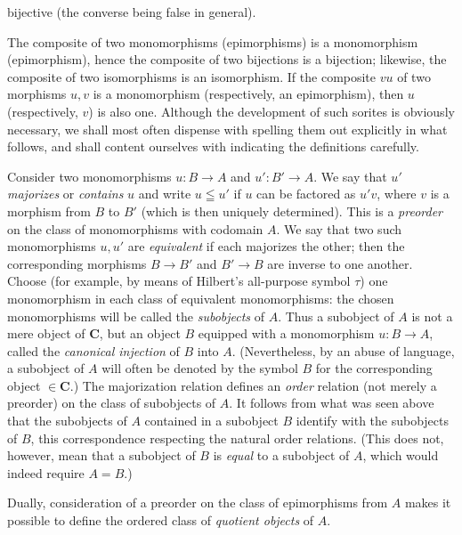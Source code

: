 
\noindent bijective (the converse being false in general).

The composite of two monomorphisms (epimorphisms) is a monomorphism
(epimorphism), hence the composite of two bijections is a bijection; likewise,
the composite of two isomorphisms is an isomorphism. If the composite $vu$ of
two morphisms $u,v$ is a monomorphism (respectively, an epimorphism), then $u$
(respectively, $v$) is also one. Although the development of such sorites is
obviously necessary, we shall most often dispense with spelling them out
explicitly in what follows, and shall content ourselves with indicating the
definitions carefully.

Consider two monomorphisms $u:B\to A$ and
$u':B'\to A$. We say that $u'$ \textit{majorizes} or \textit{contains} $u$
and write $u\leqq u'$ if $u$ can be factored as $u'v$, where $v$ is a morphism
from $B$ to $B'$ (which is then uniquely determined). This is a
\textit{preorder} on the class of monomorphisms with codomain $A$. We say that
two such monomorphisms $u,u'$ are \textit{equivalent} if each majorizes the
other; then the corresponding morphisms $B\to B'$ and
$B'\to B$ are inverse to one another. Choose (for example, by
means of Hilbert's all-purpose symbol $\tau$) one monomorphism in each class of
equivalent monomorphisms: the chosen monomorphisms will be called the
\textit{subobjects} of $A$. Thus a subobject of $A$ is not a mere object of
$\mathbf{C}$, but an object $B$ equipped with a monomorphism $u:B\to A$,
called the \textit{canonical injection} of $B$ into $A$. (Nevertheless, by an
abuse of language, a subobject of $A$ will often be denoted by the symbol $B$
for the corresponding object $\in\mathbf{C}$.) The majorization relation defines an
\textit{order} relation (not merely a preorder) on the class of subobjects of
$A$. It follows from what was seen above that the subobjects of $A$ contained
in a subobject $B$ identify with the subobjects of $B$, this correspondence
respecting the natural order relations. (This does not, however, mean that a
subobject of $B$ is \textit{equal} to a subobject of $A$, which would indeed
require $A=B$.)

Dually, consideration of a preorder on the class of epimorphisms from $A$
makes it possible to define the ordered class of \textit{quotient objects} of $A$.

